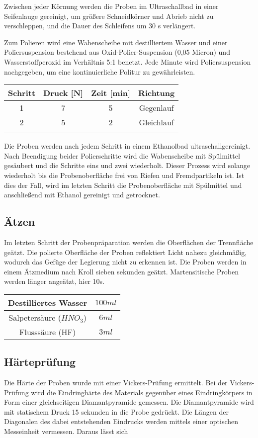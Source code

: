 Zwischen jeder Körnung werden die Proben im Ultraschallbad in einer Seifenlauge gereinigt, um größere Schneidkörner und Abrieb nicht zu verschleppen, und die Dauer des Schleifens um 30 s verlängert. 

Zum Polieren wird eine Wabenscheibe mit destilliertem Wasser und einer Poliersuspension bestehend aus Oxid-Polier-Suspension (0,05 Micron) und Wasserstoffperoxid im Verhältnis 5:1 benetzt. Jede Minute wird Poliersuspension nachgegeben, um eine kontinuierliche Politur zu gewährleisten. 

\begin{tabular}{|c|c|c|c|}
	\hline 
	Schritt & Druck [N] & Zeit [min] & Richtung \\ 
	\hline 
	1 & 7 & 5 & Gegenlauf \\ 
	\hline 
	2 & 5 & 2 & Gleichlauf \\ 
	\hline
	\label{key}
\end{tabular} 


Die Proben werden nach jedem Schritt in einem Ethanolbad ultraschallgereinigt. Nach Beendigung beider Polierschritte wird die Wabenscheibe mit Spülmittel gesäubert und die Schritte eins und zwei wiederholt. Dieser Prozess wird solange wiederholt bis die Probenoberfläche frei von Riefen und Fremdpartikeln ist. Ist dies der Fall, wird im letzten Schritt die Probenoberfläche mit Spülmittel und anschließend mit Ethanol gereinigt und getrocknet. 


\subsection{Ätzen}

Im letzten Schritt der Probenpräparation werden die Oberflächen der Trennfläche geätzt. Die polierte Oberfläche der Proben reflektiert Licht nahezu gleichmäßig, wodurch das Gefüge der Legierung nicht zu erkennen ist. 
Die Proben werden in einem Ätzmedium nach Kroll sieben sekunden geätzt. Martensitische Proben werden länger angeätzt, hier 10s. 

\begin{tabular}{|c|c|}
	\hline 
	Destilliertes Wasser
	& $100ml$
	\\ 
	\hline 
	Salpetersäure ($HNO_{3}$)	& $6ml$
	\\ 
	\hline 
	Flusssäure (HF) & $3ml$
	\\ 
	\hline 
\end{tabular} 


\subsection{Härteprüfung}

Die Härte der Proben wurde mit einer Vickers-Prüfung ermittelt. Bei der Vickers-Prüfung wird die Eindringhärte des Materials gegenüber eines Eindringkörpers in Form einer gleichseitigen Diamantpyramide gemessen. Die Diamantpyramide wird mit statischem Druck 15 sekunden in die Probe gedrückt. Die Längen der Diagonalen des dabei entstehenden Eindrucks werden mittels einer optischen Messeinheit vermessen. Daraus lässt sich 

